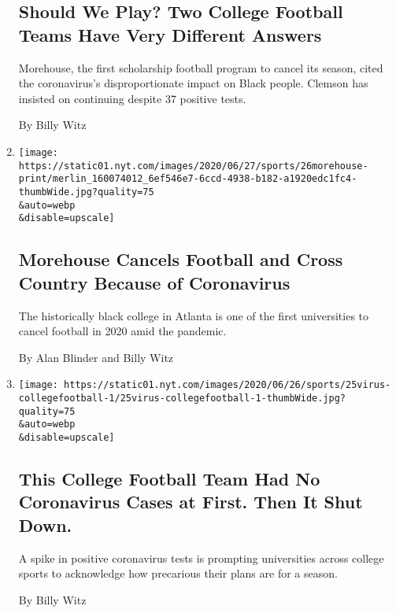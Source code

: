 \begin{enumerate}
  \hypertarget{should-we-play-two-college-football-teams-have-very-different-answers}{%
  \subsection{Should We Play? Two College Football Teams Have Very
  Different
  Answers}\label{should-we-play-two-college-football-teams-have-very-different-answers}}

  Morehouse, the first scholarship football program to cancel its
  season, cited the coronavirus's disproportionate impact on Black
  people. Clemson has insisted on continuing despite 37 positive tests.

  By Billy Witz
\item
  \href{/2020/06/26/sports/ncaafootball/coronavirus-morehouse-football.html}{}

  \texttt{[image: https://static01.nyt.com/images/2020/06/27/sports/26morehouse-print/merlin\_160074012\_6ef546e7-6ccd-4938-b182-a1920edc1fc4-thumbWide.jpg?quality=75\\\&auto=webp\\\&disable=upscale]}

  \hypertarget{morehouse-cancels-football-and-cross-country-because-of-coronavirus}{%
  \subsection{Morehouse Cancels Football and Cross Country Because of
  Coronavirus}\label{morehouse-cancels-football-and-cross-country-because-of-coronavirus}}

  The historically black college in Atlanta is one of the first
  universities to cancel football in 2020 amid the pandemic.

  By Alan Blinder and Billy Witz
\item
  \href{/2020/06/25/sports/ncaafootball/college-football-coronavirus-cases.html}{}

  \texttt{[image: https://static01.nyt.com/images/2020/06/26/sports/25virus-collegefootball-1/25virus-collegefootball-1-thumbWide.jpg?quality=75\\\&auto=webp\\\&disable=upscale]}

  \hypertarget{this-college-football-team-had-no-coronavirus-cases-at-first-then-it-shut-down}{%
  \subsection{This College Football Team Had No Coronavirus Cases at
  First. Then It Shut
  Down.}\label{this-college-football-team-had-no-coronavirus-cases-at-first-then-it-shut-down}}

  A spike in positive coronavirus tests is prompting universities across
  college sports to acknowledge how precarious their plans are for a
  season.

  By Billy Witz
\end{enumerate}

